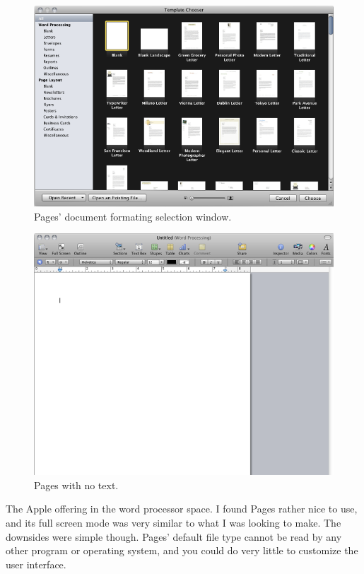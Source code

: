 \documentclass[10pt]{article}
\begin{document}
\begin{figure}
   \centering
      \includegraphics[width=130mm]{images/pages1.png}
   \caption{Pages' document formating selection window.}
\end{figure}

\begin{figure}
   \centering
      \includegraphics[width=130mm]{images/pages2.png}
   \caption{Pages with no text.}
\end{figure}

The Apple offering in the word processor space. I found Pages rather nice to use, and its full screen mode was very similar to what I was looking to make. The downsides were simple though. Pages' default file type cannot be read by any other program or operating system, and you could do very little to customize the user interface.
\end{document}
